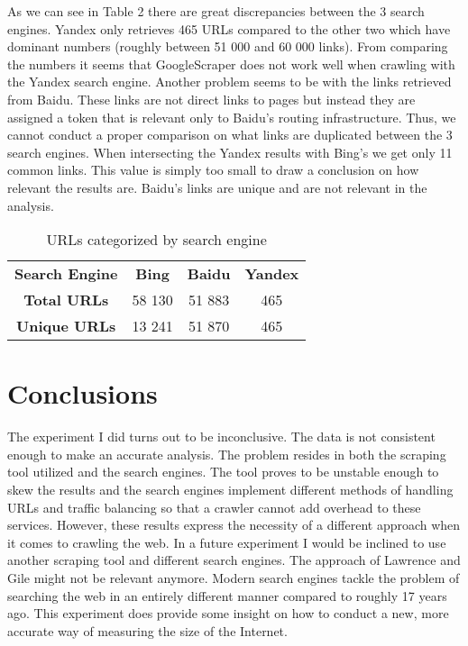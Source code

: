 \documentclass{sig-alternate}
\begin{document}
As we can see in Table 2 there are great discrepancies between the 3 search engines. Yandex only retrieves 465 URLs compared to the other two which have dominant numbers (roughly between 51 000 and 60 000 links). From comparing the numbers it seems that GoogleScraper does not work well when crawling with the Yandex search engine. Another problem seems to be with the links retrieved from Baidu. These links are not direct links to pages but instead they are assigned a token that is relevant only to Baidu's routing infrastructure. Thus, we cannot conduct a proper comparison on what links are duplicated between the 3 search engines. When intersecting the Yandex results with Bing's we get only 11 common links. This value is simply too small to draw a conclusion on how relevant the results are. Baidu's links are unique and are not relevant in the analysis.

\begin{table}[h]
\centering
\begin{tabular}{|c|c|c|c|}
\hline
\rowcolor[HTML]{343434} 
{\color[HTML]{FFFFFF} \textbf{Search Engine}} & {\color[HTML]{FFFFFF} \textbf{Bing}} & {\color[HTML]{FFFFFF} \textbf{Baidu}} & {\color[HTML]{FFFFFF} \textbf{Yandex}} \\
\textbf{Total URLs}                           & 58 130                               & 51 883                                & 465                                    \\ \hline
\textbf{Unique URLs}                          & 13 241                               & 51 870                                 & 465                                  \\ \hline 
\end{tabular}
\caption{URLs categorized by search engine}
\end{table}



\section{Conclusions}
The experiment I did turns out to be inconclusive. The data is not consistent enough to make an accurate analysis. The problem resides in both the scraping tool utilized and the search engines. The tool proves to be unstable enough to skew the results and the search engines implement different methods of handling URLs and traffic balancing so that a crawler cannot add overhead to these services. However, these results express the necessity of a different approach when it comes to crawling the web. In a future experiment I would be inclined to use another scraping tool and different search engines. The approach of  Lawrence and Gile might not be relevant anymore. Modern search engines tackle the problem of searching the web in an entirely different manner compared to roughly 17 years ago. This experiment does provide some insight on how to conduct a new, more accurate way of measuring the size of the Internet.
\end{document}
